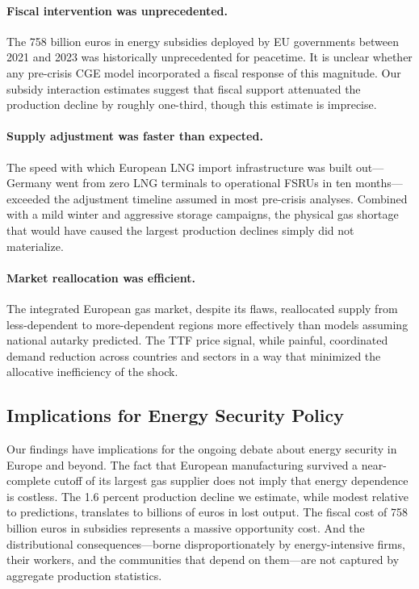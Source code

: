 \documentclass[12pt]{article}
\begin{document}
\paragraph{Fiscal intervention was unprecedented.} The 758 billion euros in energy subsidies deployed by EU governments between 2021 and 2023 was historically unprecedented for peacetime. It is unclear whether any pre-crisis CGE model incorporated a fiscal response of this magnitude. Our subsidy interaction estimates suggest that fiscal support attenuated the production decline by roughly one-third, though this estimate is imprecise.

\paragraph{Supply adjustment was faster than expected.} The speed with which European LNG import infrastructure was built out---Germany went from zero LNG terminals to operational FSRUs in ten months---exceeded the adjustment timeline assumed in most pre-crisis analyses. Combined with a mild winter and aggressive storage campaigns, the physical gas shortage that would have caused the largest production declines simply did not materialize.

\paragraph{Market reallocation was efficient.} The integrated European gas market, despite its flaws, reallocated supply from less-dependent to more-dependent regions more effectively than models assuming national autarky predicted. The TTF price signal, while painful, coordinated demand reduction across countries and sectors in a way that minimized the allocative inefficiency of the shock.

\subsection{Implications for Energy Security Policy}

Our findings have implications for the ongoing debate about energy security in Europe and beyond. The fact that European manufacturing survived a near-complete cutoff of its largest gas supplier does not imply that energy dependence is costless. The 1.6 percent production decline we estimate, while modest relative to predictions, translates to billions of euros in lost output. The fiscal cost of 758 billion euros in subsidies represents a massive opportunity cost. And the distributional consequences---borne disproportionately by energy-intensive firms, their workers, and the communities that depend on them---are not captured by aggregate production statistics.
\end{document}
